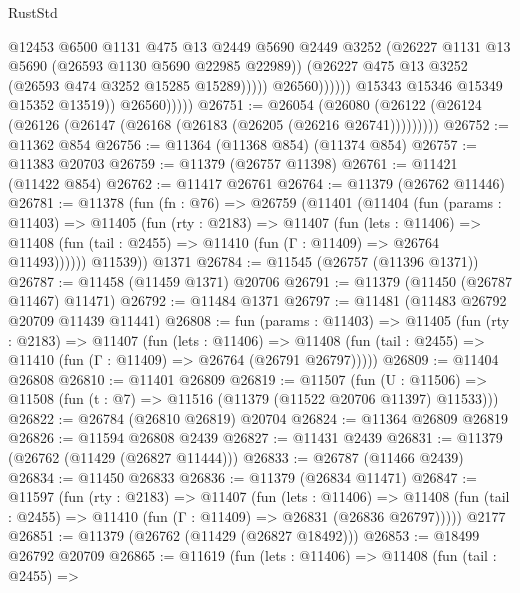 \begin{lexlean}{RustStd}
\begin{coremodule}
                                    @12453
                                    @6500
                                    @1131
                                    @475
                                    @13
                                    @2449
                                    @5690
                                    @2449
                                    @3252
                                    (@26227 @1131 @13 @5690 (@26593 @1130 @5690 @22985 @22989))
                                    (@26227 @475 @13 @3252 (@26593 @474 @3252 @15285 @15289)))))
                              @26560))))))
                  @15343
                  @15346
                  @15349
                  @15352
                  @13519))
              @26560)))))
@26751 := @26054
    (@26080 (@26122 (@26124 (@26126 (@26147 (@26168 (@26183 (@26205 (@26216 @26741)))))))))
@26752 := @11362 @854
@26756 := @11364 (@11368 @854) (@11374 @854)
@26757 := @11383 @20703
@26759 := @11379 (@26757 @11398)
@26761 := @11421 (@11422 @854)
@26762 := @11417 @26761
@26764 := @11379 (@26762 @11446)
@26781 := @11378
    (fun (fn : @76) =>
    @26759
      (@11401
        (@11404
          (fun (params : @11403) =>
          @11405
            (fun (rty : @2183) =>
            @11407
              (fun (lets : @11406) =>
              @11408 (fun (tail : @2455) => @11410 (fun (Γ : @11409) => @26764 @11493))))))
        @11539))
    @1371
@26784 := @11545 (@26757 (@11396 @1371))
@26787 := @11458 (@11459 @1371) @20706
@26791 := @11379 (@11450 (@26787 @11467) @11471)
@26792 := @11484 @1371
@26797 := @11481 (@11483 @26792 @20709 @11439 @11441)
@26808 := fun (params : @11403) =>
  @11405
    (fun (rty : @2183) =>
    @11407
      (fun (lets : @11406) =>
      @11408 (fun (tail : @2455) => @11410 (fun (Γ : @11409) => @26764 (@26791 @26797)))))
@26809 := @11404 @26808
@26810 := @11401 @26809
@26819 := @11507
    (fun (U : @11506) => @11508 (fun (t : @7) => @11516 (@11379 (@11522 @20706 @11397) @11533)))
@26822 := @26784 (@26810 @26819) @20704
@26824 := @11364 @26809 @26819
@26826 := @11594 @26808 @2439
@26827 := @11431 @2439
@26831 := @11379 (@26762 (@11429 (@26827 @11444)))
@26833 := @26787 (@11466 @2439)
@26834 := @11450 @26833
@26836 := @11379 (@26834 @11471)
@26847 := @11597
    (fun (rty : @2183) =>
    @11407
      (fun (lets : @11406) =>
      @11408 (fun (tail : @2455) => @11410 (fun (Γ : @11409) => @26831 (@26836 @26797)))))
    @2177
@26851 := @11379 (@26762 (@11429 (@26827 @18492)))
@26853 := @18499 @26792 @20709
@26865 := @11619
    (fun (lets : @11406) =>
    @11408
      (fun (tail : @2455) =>

\end{coremodule}
\end{lexlean}
